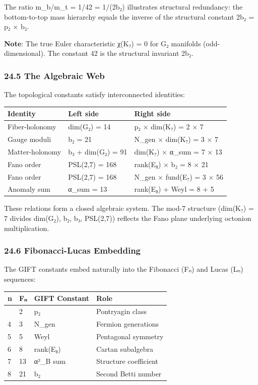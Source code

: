 \documentclass[11pt,a4paper]{article}
\begin{document}
The ratio m\_b/m\_t = 1/42 = 1/(2b₂) illustrates structural redundancy: the bottom-to-top mass hierarchy equals the inverse of the structural constant 2b₂ = p₂ × b₂.

\textbf{Note}: The true Euler characteristic χ(K₇) = 0 for G₂ manifolds (odd-dimensional). The constant 42 is the structural invariant 2b₂.

\subsubsection{24.5 The Algebraic Web}\label{the-algebraic-web}

The topological constants satisfy interconnected identities:

{\def\LTcaptype{none} %
\begin{longtable}[]{@{}lll@{}}
\toprule\noalign{}
Identity & Left side & Right side \\
\midrule\noalign{}
\endhead
\bottomrule\noalign{}
\endlastfoot
Fiber-holonomy & dim(G₂) = 14 & p₂ × dim(K₇) = 2 × 7 \\
Gauge moduli & b₂ = 21 & N\_gen × dim(K₇) = 3 × 7 \\
Matter-holonomy & b₃ + dim(G₂) = 91 & dim(K₇) × α\_sum = 7 × 13 \\
Fano order & PSL(2,7) = 168 & rank(E₈) × b₂ = 8 × 21 \\
Fano order & PSL(2,7) = 168 & N\_gen × fund(E₇) = 3 × 56 \\
Anomaly sum & α\_sum = 13 & rank(E₈) + Weyl = 8 + 5 \\
\end{longtable}
}

These relations form a closed algebraic system. The mod-7 structure (dim(K₇) = 7 divides dim(G₂), b₂, b₃, PSL(2,7)) reflects the Fano plane underlying octonion multiplication.

\subsubsection{24.6 Fibonacci-Lucas Embedding}\label{fibonacci-lucas-embedding}

The GIFT constants embed naturally into the Fibonacci (Fₙ) and Lucas (Lₙ) sequences:

{\def\LTcaptype{none} %
\begin{longtable}[]{@{}llll@{}}
\toprule\noalign{}
n & Fₙ & GIFT Constant & Role \\
\midrule\noalign{}
\endhead
\bottomrule\noalign{}
\endlastfoot
3 & 2 & p₂ & Pontryagin class \\
4 & 3 & N\_gen & Fermion generations \\
5 & 5 & Weyl & Pentagonal symmetry \\
6 & 8 & rank(E₈) & Cartan subalgebra \\
7 & 13 & α²\_B sum & Structure coefficient \\
8 & 21 & b₂ & Second Betti number \\
\end{longtable}
}
\end{document}
